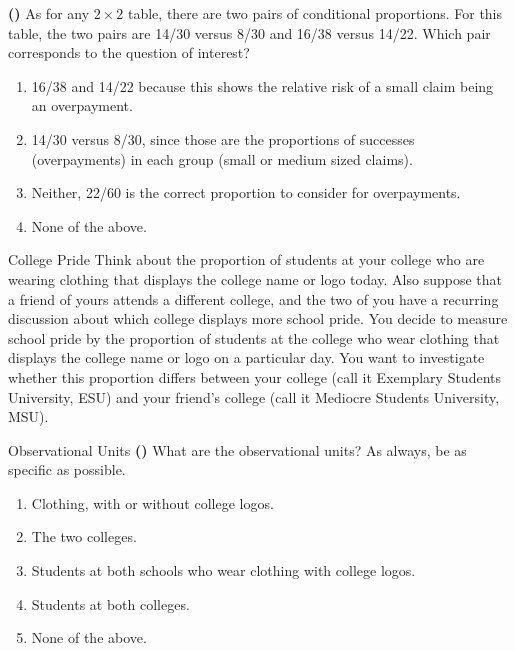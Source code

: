 \documentclass[13pt]{beamer}
\newcounter{count}
\newcommand{\question}{ \textbf{(\decimal{count})} \stepcounter{count}}
\newenvironment{click}{\begin{enumerate}[A]}{\end{enumerate}}
\begin{document}
\begin{frame}
\question As for any $2 \times 2$ table, there are two pairs of conditional proportions. For this table, the two pairs are 14/30 versus 8/30 and 16/38 versus 14/22. Which pair corresponds to the question of interest?
\begin{click}
   \item 16/38 and 14/22 because this shows the relative risk of a small claim being an overpayment.
      \item 14/30 versus 8/30, since those are the proportions of successes (overpayments) in each group (small or medium sized claims). %
   \item Neither, 22/60 is the correct proportion to consider for overpayments.
   \item None of the above.
\end{click}
\end{frame}


\begin{frame}{College Pride}
Think about the proportion of students at your college who are wearing clothing that displays the college name or logo today. Also suppose that a friend of yours attends a different college, and the two of you have a recurring discussion about which college displays more school pride. You decide to measure school pride by the proportion of students at the college who wear clothing that displays the college name or logo on a particular day. You want to investigate whether this proportion differs between your college (call it Exemplary Students University, ESU) and your friend’s college (call it Mediocre Students University, MSU).
\end{frame}

\begin{frame}{Observational Units}
\question What are the observational units?  As always, be as specific as possible.
\begin{click}
   \item Clothing, with or without college logos.
   \item The two colleges.
   \item Students at both schools who wear clothing with college logos.
   \item Students at both colleges. %
   \item None of the above.
\end{click}
\end{frame}
\end{document}
